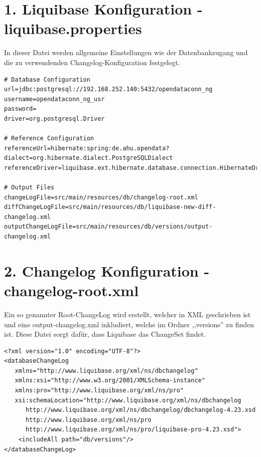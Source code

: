 \documentclass[a4paper,12pt]{scrreprt}
\begin{document}
\section*{\small \textbf{1. Liquibase Konfiguration - liquibase.properties}}
In dieser Datei werden allgemeine Einstellungen wie der Datenbankzugang und die zu verwendenden Changelog-Konfiguration festgelegt.
\begin{lstlisting}[language=properties]
# Database Configuration
url=jdbc:postgresql://192.168.252.140:5432/opendataconn_ng
username=opendataconn_ng_usr
password=
driver=org.postgresql.Driver

# Reference Configuration
referenceUrl=hibernate:spring:de.ahu.opendata?dialect=org.hibernate.dialect.PostgreSQLDialect
referenceDriver=liquibase.ext.hibernate.database.connection.HibernateDriver

# Output Files
changeLogFile=src/main/resources/db/changelog-root.xml
diffChangeLogFile=src/main/resources/db/liquibase-new-diff-changelog.xml
outputChangeLogFile=src/main/resources/db/versions/output-changelog.xml
\end{lstlisting}
\section*{\small \textbf{2. Changelog Konfiguration - changelog-root.xml}}
Ein so genannter Root-ChangeLog wird erstellt, welcher in XML geschrieben ist und eine output-changelog.xml inkludiert, welche im Ordner ,,versions'' zu finden ist. Diese Datei sorgt dafür, dass Liquibase das ChangeSet findet.
\begin{lstlisting}
<?xml version="1.0" encoding="UTF-8"?>   
<databaseChangeLog
   xmlns="http://www.liquibase.org/xml/ns/dbchangelog"
   xmlns:xsi="http://www.w3.org/2001/XMLSchema-instance"
   xmlns:pro="http://www.liquibase.org/xml/ns/pro"
   xsi:schemaLocation="http://www.liquibase.org/xml/ns/dbchangelog
      http://www.liquibase.org/xml/ns/dbchangelog/dbchangelog-4.23.xsd
      http://www.liquibase.org/xml/ns/pro 
      http://www.liquibase.org/xml/ns/pro/liquibase-pro-4.23.xsd">  
    <includeAll path="db/versions"/>  
</databaseChangeLog>
\end{lstlisting}
\end{document}
